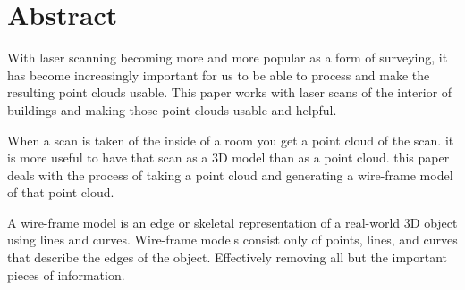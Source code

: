 

\section*{Abstract}

	With laser scanning becoming more and more popular as a form of surveying, it has become increasingly important for us to be able to process and make the resulting point clouds usable. This paper works with laser scans of the interior of buildings and making those point clouds usable and helpful.
	
	When a scan is taken of the inside of a room you get a point cloud of the scan. it is more useful to have that scan as a 3D model than as a point cloud. this paper deals with the process of taking a point cloud and generating a wire-frame model of that point cloud.
	
	A wire-frame model is an edge or skeletal representation of a real-world 3D object using lines and curves. Wire-frame models consist only of points, lines, and curves that describe the edges of the object. Effectively removing all but the important pieces of information.
	
	
	
	
	
